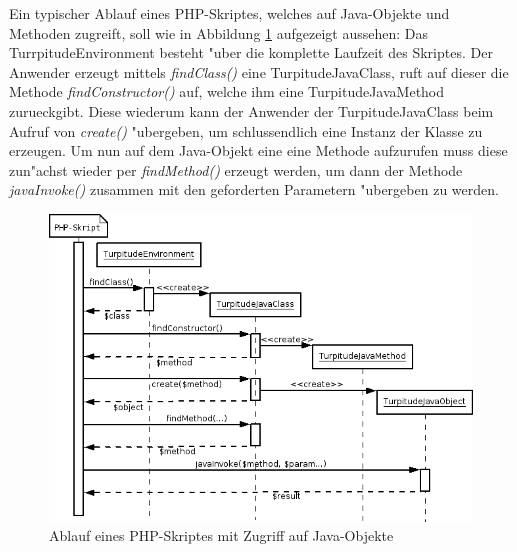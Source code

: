 Ein typischer Ablauf eines PHP-Skriptes, welches auf Java-Objekte und Methoden zugreift, soll wie in Abbildung \ref{fig:phpseq} aufgezeigt 
aussehen:
Das TurrpitudeEnvironment besteht "uber die komplette Laufzeit des Skriptes. Der Anwender erzeugt mittels \emph{findClass()} eine
TurpitudeJavaClass, ruft auf dieser die Methode \emph{findConstructor()} auf, welche ihm eine TurpitudeJavaMethod zurueckgibt. Diese wiederum 
kann der Anwender der TurpitudeJavaClass beim Aufruf von \emph{create()} "ubergeben, um schlussendlich eine Instanz der Klasse zu erzeugen.
Um nun auf dem Java-Objekt eine eine Methode aufzurufen muss diese zun"achst wieder per \emph{findMethod()} erzeugt werden, um dann der
Methode \emph{javaInvoke()} zusammen mit den geforderten Parametern "ubergeben zu werden.

\begin{figure}[h]
\includegraphics[width=\textwidth]{chap1/img/phpseq.png}
\caption{Ablauf eines PHP-Skriptes mit Zugriff auf Java-Objekte}
\label{fig:phpseq}
\end{figure}



